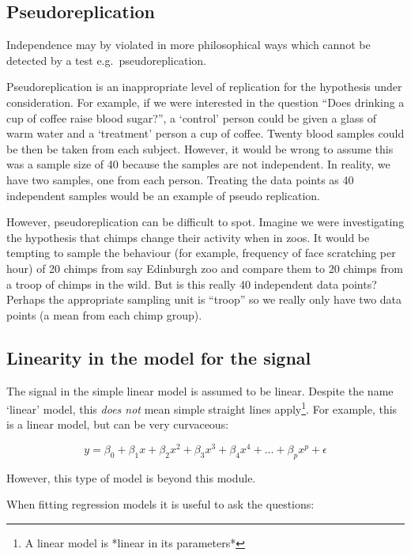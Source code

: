 \documentclass[
  oneside]{krantz}
\begin{document}
\hypertarget{pseudoreplication}{%
\subsection{Pseudoreplication}\label{pseudoreplication}}

Independence may by violated in more philosophical ways which cannot be detected by a test e.g.~pseudoreplication.

Pseudoreplication is an inappropriate level of replication for the hypothesis under consideration. For example, if we were interested in the question ``Does drinking a cup of coffee raise blood sugar?'', a `control' person could be given a glass of warm water and a `treatment' person a cup of coffee. Twenty blood samples could be then be taken from each subject. However, it would be wrong to assume this was a sample size of 40 because the samples are not independent. In reality, we have two samples, one from each person. Treating the data points as 40 independent samples would be an example of pseudo replication.

However, pseudoreplication can be difficult to spot. Imagine we were investigating the hypothesis that chimps change their activity when in zoos. It would be tempting to sample the behaviour (for example, frequency of face scratching per hour) of 20 chimps from say Edinburgh zoo and compare them to 20 chimps from a troop of chimps in the wild. But is this really 40 independent data points? Perhaps the appropriate sampling unit is ``troop'' so we really only have two data points (a mean from each chimp group).

\hypertarget{linearity-in-the-model-for-the-signal}{%
\subsection{Linearity in the model for the signal}\label{linearity-in-the-model-for-the-signal}}

The signal in the simple linear model is assumed to be linear. Despite the name `linear' model, this \emph{does not} mean simple straight lines apply\footnote{A linear model is *linear in its parameters*}. For example, this is a linear model, but can be very curvaceous:

\[
y = \beta_0 + \beta_1 x + \beta_2 x^2 + \beta_3 x^3 + \beta_4 x^4 + ... + \beta_p x^p + \epsilon
\]

However, this type of model is beyond this module.

When fitting regression models it is useful to ask the questions:
\end{document}
